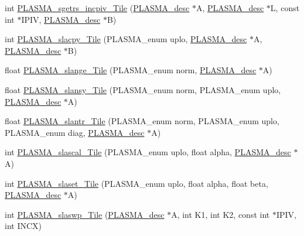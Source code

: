 \begin{DoxyCompactItemize}
\item 
int \hyperlink{group__float__Tile_gaa98543a9a1cd907186e2782b747b24e7_gaa98543a9a1cd907186e2782b747b24e7}{P\+L\+A\+S\+M\+A\+\_\+sgetrs\+\_\+incpiv\+\_\+\+Tile} (\hyperlink{structplasma__desc__t}{P\+L\+A\+S\+M\+A\+\_\+desc} $\ast$A, \hyperlink{structplasma__desc__t}{P\+L\+A\+S\+M\+A\+\_\+desc} $\ast$L, const int $\ast$I\+P\+I\+V, \hyperlink{structplasma__desc__t}{P\+L\+A\+S\+M\+A\+\_\+desc} $\ast$B)
\item 
int \hyperlink{group__float__Tile_ga193e5c454b84586721c37715e256e031_ga193e5c454b84586721c37715e256e031}{P\+L\+A\+S\+M\+A\+\_\+slacpy\+\_\+\+Tile} (P\+L\+A\+S\+M\+A\+\_\+enum uplo, \hyperlink{structplasma__desc__t}{P\+L\+A\+S\+M\+A\+\_\+desc} $\ast$A, \hyperlink{structplasma__desc__t}{P\+L\+A\+S\+M\+A\+\_\+desc} $\ast$B)
\item 
float \hyperlink{group__float__Tile_ga61ffd2b03e42781889b76ea9809984dc_ga61ffd2b03e42781889b76ea9809984dc}{P\+L\+A\+S\+M\+A\+\_\+slange\+\_\+\+Tile} (P\+L\+A\+S\+M\+A\+\_\+enum norm, \hyperlink{structplasma__desc__t}{P\+L\+A\+S\+M\+A\+\_\+desc} $\ast$A)
\item 
float \hyperlink{group__float__Tile_ga322b3d40025bb05fcf66cf49ad0fb852_ga322b3d40025bb05fcf66cf49ad0fb852}{P\+L\+A\+S\+M\+A\+\_\+slansy\+\_\+\+Tile} (P\+L\+A\+S\+M\+A\+\_\+enum norm, P\+L\+A\+S\+M\+A\+\_\+enum uplo, \hyperlink{structplasma__desc__t}{P\+L\+A\+S\+M\+A\+\_\+desc} $\ast$A)
\item 
float \hyperlink{group__float__Tile_ga38d0034b144f319eff737318000185e7_ga38d0034b144f319eff737318000185e7}{P\+L\+A\+S\+M\+A\+\_\+slantr\+\_\+\+Tile} (P\+L\+A\+S\+M\+A\+\_\+enum norm, P\+L\+A\+S\+M\+A\+\_\+enum uplo, P\+L\+A\+S\+M\+A\+\_\+enum diag, \hyperlink{structplasma__desc__t}{P\+L\+A\+S\+M\+A\+\_\+desc} $\ast$A)
\item 
int \hyperlink{group__float__Tile_gade4d5b02320ac7c43db295331f9a59d5_gade4d5b02320ac7c43db295331f9a59d5}{P\+L\+A\+S\+M\+A\+\_\+slascal\+\_\+\+Tile} (P\+L\+A\+S\+M\+A\+\_\+enum uplo, float alpha, \hyperlink{structplasma__desc__t}{P\+L\+A\+S\+M\+A\+\_\+desc} $\ast$A)
\item 
int \hyperlink{group__float__Tile_ga828b9b130d38b4b3084650f7ac806cde_ga828b9b130d38b4b3084650f7ac806cde}{P\+L\+A\+S\+M\+A\+\_\+slaset\+\_\+\+Tile} (P\+L\+A\+S\+M\+A\+\_\+enum uplo, float alpha, float beta, \hyperlink{structplasma__desc__t}{P\+L\+A\+S\+M\+A\+\_\+desc} $\ast$A)
\item 
int \hyperlink{group__float__Tile_gad5b3f7d921625de64163aaffd05ca4ba_gad5b3f7d921625de64163aaffd05ca4ba}{P\+L\+A\+S\+M\+A\+\_\+slaswp\+\_\+\+Tile} (\hyperlink{structplasma__desc__t}{P\+L\+A\+S\+M\+A\+\_\+desc} $\ast$A, int K1, int K2, const int $\ast$I\+P\+I\+V, int I\+N\+C\+X)

\end{DoxyCompactItemize}
